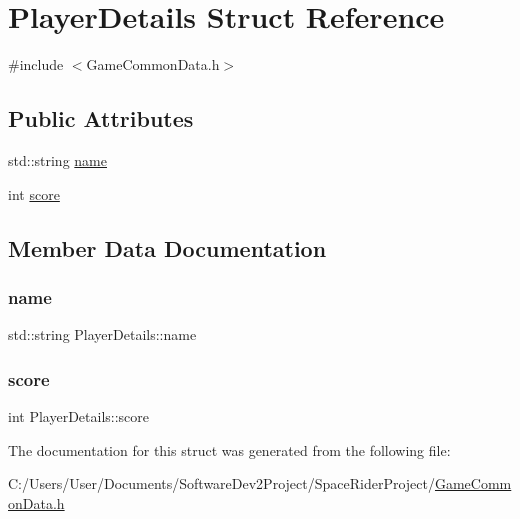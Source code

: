 \hypertarget{struct_player_details}{}\section{Player\+Details Struct Reference}
\label{struct_player_details}


{\ttfamily \#include $<$Game\+Common\+Data.\+h$>$}

\subsection*{Public Attributes}
\begin{DoxyCompactItemize}
\item 
std\+::string \hyperlink{struct_player_details_a3d54d9926c514fc131a2bfbb4c15bb3d}{name}
\item 
int \hyperlink{struct_player_details_a67da3a3865a29976bfac1c33e5b0bfd8}{score}
\end{DoxyCompactItemize}


\subsection{Member Data Documentation}
\mbox{\label{struct_player_details_a3d54d9926c514fc131a2bfbb4c15bb3d}} 
\subsubsection{\texorpdfstring{name}{name}}
{\footnotesize\ttfamily std\+::string Player\+Details\+::name}

\mbox{\label{struct_player_details_a67da3a3865a29976bfac1c33e5b0bfd8}} 
\subsubsection{\texorpdfstring{score}{score}}
{\footnotesize\ttfamily int Player\+Details\+::score}



The documentation for this struct was generated from the following file\+:\begin{DoxyCompactItemize}
\item 
C\+:/\+Users/\+User/\+Documents/\+Software\+Dev2\+Project/\+Space\+Rider\+Project/\hyperlink{_game_common_data_8h}{Game\+Common\+Data.\+h}\end{DoxyCompactItemize}

